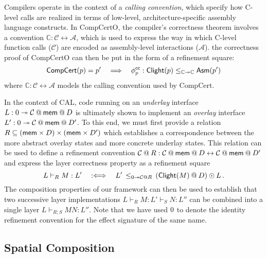 \begin{example} %
\label{ex:bq-proof}
Compilers operate in the context of a \emph{calling convention},
which specify how C-level calls are realized
in terms of low-level, architecture-specific assembly language constructs.
In CompCertO,
the compiler's correctness theorem involves
a convention
$\mathbb{C} : \mathcal{C} \leftrightarrow \mathcal{A}$,
which is used to express the way in which
C-level function calls ($\mathcal{C}$) are encoded
as assembly-level interactions ($\mathcal{A}$).
the correctness proof of CompCertO
can then be put in the form of a refinement square:
\[
   \mathsf{CompCert} (p) = p'
  \quad \Longrightarrow \quad
    \phi^{ \mathsf{cc} }_p :
       \mathsf{Clight} (p) \le_{\mathbb{C} \twoheadrightarrow \mathbb{C}}  \mathsf{Asm} (p')
\]
where %
$\mathbb{C} : \mathcal{C} \leftrightarrow \mathcal{A}$
models the calling convention used by CompCert.
\end{example}

\begin{example} %
In the context of CAL,
code running on an \emph{underlay} interface
$L : \emptysig \twoheadrightarrow \mathcal{C} \mathbin@ \kw{mem} \mathbin@ D$
is ultimately shown to implement an \emph{overlay} interface
$L' : \emptysig \twoheadrightarrow \mathcal{C} \mathbin@ \kw{mem} \mathbin@ D'$.
To this end, we must first provide a relation
$R \subseteq ( \mathsf{mem}  \times D) \times ( \mathsf{mem}  \times D')$
which establishes a correspondence between
the more abstract overlay states and more concrete underlay states.
This relation can be used to define a refinement convention
$\mathcal{C} \mathbin@ R : \mathcal{C} \mathbin@ \kw{mem} \mathbin@ D
 \leftrightarrow \mathcal{C} \mathbin@ \kw{mem} \mathbin@ D'$
and express the layer correctness property as a refinement square
\[
  L \vdash_R M : L' \quad :\Longleftrightarrow \quad
  L' \, \le_{\emptysig \twoheadrightarrow \mathcal{C} \mathbin@ R} \,
    (\kw{Clight}(M) \mathbin@ D) \odot L
  \,.
\]
The composition properties of our framework can then be used to establish that
two successive layer implementations
$L \vdash_R M : L' \vdash_S N : L''$ can be combined into a single layer
$L \vdash_{R \mathbin; S} M N : L''$.
Note that we have used $0$ to denote the identity refinement convention
for the effect signature of the same name. 
\end{example}


\subsection{Spatial Composition} %

